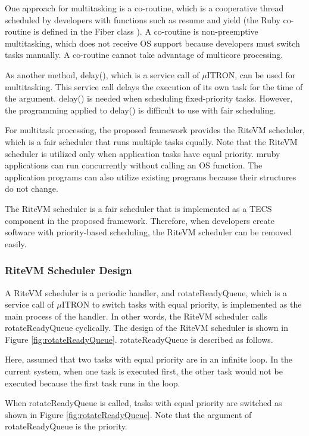 \documentclass{sig-alternate-05-2015}
\begin{document}
One approach for multitasking is a co-routine, which is a cooperative thread scheduled by developers with functions such as {\myit resume} and {\myit yield} (the Ruby co-routine is defined in the Fiber class \cite{url:co-routine}).
A co-routine is non-preemptive multitasking, which does not receive OS support because developers must switch tasks manually.
A co-routine cannot take advantage of multicore processing.

As another method, {\myit delay()}, which is a service call of $\mu$ITRON, can be used for multitasking.
This service call delays the execution of its own task for the time of the argument.
{\myit delay()} is needed when scheduling fixed-priority tasks.
However, the programming applied to {\myit delay()} is difficult to use with fair scheduling.

For multitask processing, the proposed framework provides the RiteVM scheduler, which is a fair scheduler that runs multiple tasks equally.
Note that the RiteVM scheduler is utilized only when application tasks have equal priority.
mruby applications can run concurrently without calling an OS function.
The application programs can also utilize existing programs because their structures do not change.

The RiteVM scheduler is a fair scheduler that is implemented as a TECS component in the proposed framework.
Therefore, when developers create software with priority-based scheduling, the RiteVM scheduler can be removed easily.


\subsubsection{RiteVM Scheduler Design}
A RiteVM scheduler is a periodic handler, and {\myit rotateReadyQueue}, which is a service call of $\mu$ITRON to switch tasks with equal priority, is implemented as the main process of the handler.
In other words, the RiteVM scheduler calls {\myit rotateReadyQueue} cyclically.
The design of the RiteVM scheduler is shown in Figure \ref{fig:rotateReadyQueue}. 
{\myit rotateReadyQueue} is described as follows.

Here, assumed that two tasks with equal priority are in an infinite loop.
In the current system, when one task is executed first, the other task would not be executed because the first task runs in the loop.

When {\myit rotateReadyQueue} is called, tasks with equal priority are switched as shown in Figure \ref{fig:rotateReadyQueue}.
Note that the argument of {\myit rotateReadyQueue} is the priority.
\end{document}
